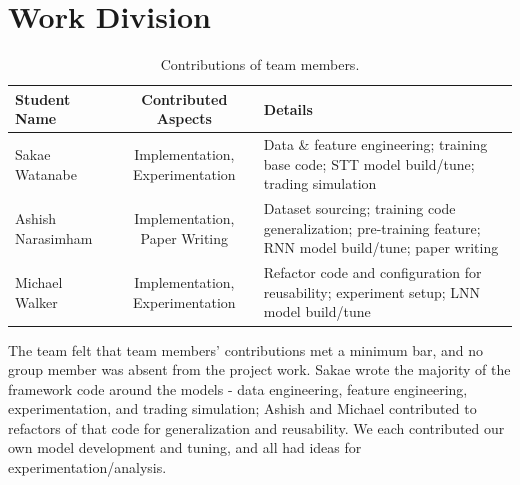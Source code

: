 \documentclass[10pt,twocolumn,letterpaper]{article}
\begin{document}



\clearpage
\section{Work Division}

\begin{table}
\begin{tabular}{|l|c|p{8cm}|}
\hline
Student Name & Contributed Aspects & Details \\
\hline\hline
Sakae Watanabe & Implementation, Experimentation & Data \& feature engineering; training base code; STT model build/tune; trading simulation\\
Ashish Narasimham & Implementation, Paper Writing & Dataset sourcing; training code generalization; pre-training feature; RNN model build/tune; paper writing \\
Michael Walker & Implementation, Experimentation & Refactor code and configuration for reusability; experiment setup; LNN model build/tune \\
\hline
\end{tabular}
\caption{Contributions of team members.}
\label{tab:contributions}
\end{table}

The team felt that team members’ contributions met a minimum bar, and no group member was absent from the project work. Sakae wrote the majority of the framework code around the models - data engineering, feature engineering, experimentation, and trading simulation; Ashish and Michael contributed to refactors of that code for generalization and reusability. We each contributed our own model development and tuning, and all had ideas for experimentation/analysis.
\end{document}
